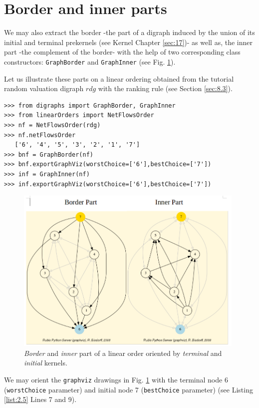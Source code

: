 \section{Border and inner parts}
\label{sec:2.4}

We may also extract the border -the part of a digraph induced by the union of its initial and terminal prekernels (see Kernel Chapter \ref{sec:17})-  as well as, the inner part -the complement of the border- with the help of two corresponding class constructors: \texttt{GraphBorder} and \texttt{GraphInner} (see Fig. \ref{fig:2.3}).

Let us illustrate these parts on a linear ordering obtained from the tutorial random valuation digraph $rdg$  with the \NetFlows ranking rule  (see Section \ref{sec:8.3}).  
\begin{lstlisting}[caption={Border and inner part of a linear order},label=list:2.5]
>>> from digraphs import GraphBorder, GraphInner
>>> from linearOrders import NetFlowsOrder
>>> nf = NetFlowsOrder(rdg)
>>> nf.netFlowsOrder
   ['6', '4', '5', '3', '2', '1', '7']
>>> bnf = GraphBorder(nf)
>>> bnf.exportGraphViz(worstChoice=['6'],bestChoice=['7'])
>>> inf = GraphInner(nf)
>>> inf.exportGraphViz(worstChoice=['6'],bestChoice=['7'])
\end{lstlisting}
\begin{figure}[h]
\includegraphics[width=11cm]{Figures/graphBorderAndInner1.png}
\caption{\emph{Border} and \emph{inner} part of a linear order oriented by \emph{terminal} and \emph{initial} kernels.}
\label{fig:2.3}       %
\end{figure}
We may orient the \texttt{graphviz} drawings in Fig. \ref{fig:2.3}  with the terminal node 6 (\texttt{worstChoice} parameter) and initial node 7 (\texttt{bestChoice} parameter) (see Listing \ref{list:2.5} Lines 7 and 9).

